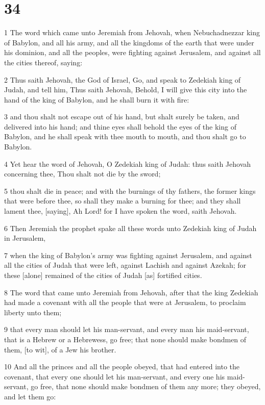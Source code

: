 \chapter{34}

\par 1 The word which came unto Jeremiah from Jehovah, when Nebuchadnezzar king of Babylon, and all his army, and all the kingdoms of the earth that were under his dominion, and all the peoples, were fighting against Jerusalem, and against all the cities thereof, saying:
\par 2 Thus saith Jehovah, the God of Israel, Go, and speak to Zedekiah king of Judah, and tell him, Thus saith Jehovah, Behold, I will give this city into the hand of the king of Babylon, and he shall burn it with fire:
\par 3 and thou shalt not escape out of his hand, but shalt surely be taken, and delivered into his hand; and thine eyes shall behold the eyes of the king of Babylon, and he shall speak with thee mouth to mouth, and thou shalt go to Babylon.
\par 4 Yet hear the word of Jehovah, O Zedekiah king of Judah: thus saith Jehovah concerning thee, Thou shalt not die by the sword;
\par 5 thou shalt die in peace; and with the burnings of thy fathers, the former kings that were before thee, so shall they make a burning for thee; and they shall lament thee, [saying], Ah Lord! for I have spoken the word, saith Jehovah.
\par 6 Then Jeremiah the prophet spake all these words unto Zedekiah king of Judah in Jerusalem,
\par 7 when the king of Babylon's army was fighting against Jerusalem, and against all the cities of Judah that were left, against Lachish and against Azekah; for these [alone] remained of the cities of Judah [as] fortified cities.
\par 8 The word that came unto Jeremiah from Jehovah, after that the king Zedekiah had made a covenant with all the people that were at Jerusalem, to proclaim liberty unto them;
\par 9 that every man should let his man-servant, and every man his maid-servant, that is a Hebrew or a Hebrewess, go free; that none should make bondmen of them, [to wit], of a Jew his brother.
\par 10 And all the princes and all the people obeyed, that had entered into the covenant, that every one should let his man-servant, and every one his maid-servant, go free, that none should make bondmen of them any more; they obeyed, and let them go:
